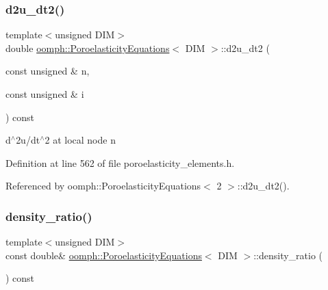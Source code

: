 \mbox{\label{classoomph_1_1PoroelasticityEquations_a63bc087ce05092bd4f4a8defc35cb2ba}} 
\subsubsection{\texorpdfstring{d2u\+\_\+dt2()}{d2u\_dt2()}}
{\footnotesize\ttfamily template$<$unsigned D\+IM$>$ \\
double \hyperlink{classoomph_1_1PoroelasticityEquations}{oomph\+::\+Poroelasticity\+Equations}$<$ D\+IM $>$\+::d2u\+\_\+dt2 (\begin{DoxyParamCaption}\item[{const unsigned \&}]{n,  }\item[{const unsigned \&}]{i }\end{DoxyParamCaption}) const\hspace{0.3cm}{\ttfamily [inline]}}



d$^\wedge$2u/dt$^\wedge$2 at local node n 



Definition at line 562 of file poroelasticity\+\_\+elements.\+h.



Referenced by oomph\+::\+Poroelasticity\+Equations$<$ 2 $>$\+::d2u\+\_\+dt2().

\mbox{\label{classoomph_1_1PoroelasticityEquations_a7528e9d4b6ca649b862d9af496bc322b}} 
\subsubsection{\texorpdfstring{density\+\_\+ratio()}{density\_ratio()}}
{\footnotesize\ttfamily template$<$unsigned D\+IM$>$ \\
const double\& \hyperlink{classoomph_1_1PoroelasticityEquations}{oomph\+::\+Poroelasticity\+Equations}$<$ D\+IM $>$\+::density\+\_\+ratio (\begin{DoxyParamCaption}{ }\end{DoxyParamCaption}) const\hspace{0.3cm}{\ttfamily [inline]}}



